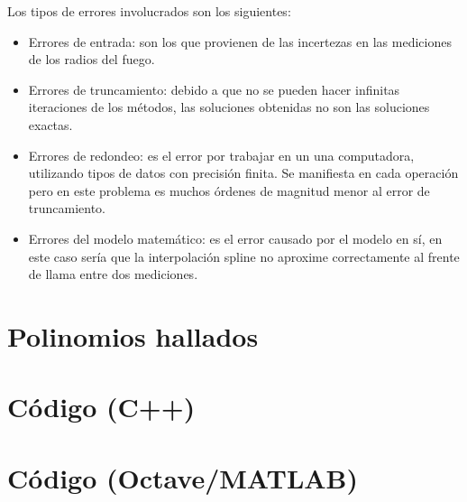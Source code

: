 \documentclass[12pt,spanish]{article}
\begin{document}
Los tipos de errores involucrados son los siguientes:
\begin{itemize}
    \item Errores de entrada: son los que provienen de las incertezas en las mediciones de los radios del fuego.
    \item Errores de truncamiento: debido a que no se pueden hacer infinitas iteraciones de los métodos, las soluciones obtenidas no son las soluciones exactas.
    \item Errores de redondeo: es el error por trabajar en un una computadora, utilizando tipos de datos con precisión finita. Se manifiesta en cada operación pero en este problema es muchos órdenes de magnitud menor al error de truncamiento.
    \item Errores del modelo matemático: es el error causado por el modelo en sí, en este caso sería que la interpolación spline no aproxime correctamente al frente de llama entre dos mediciones.
\end{itemize}

\newpage
\appendix
\section{Polinomios hallados}
\section{Código (C++)}

\section{Código (Octave/MATLAB)}

\end{document}
